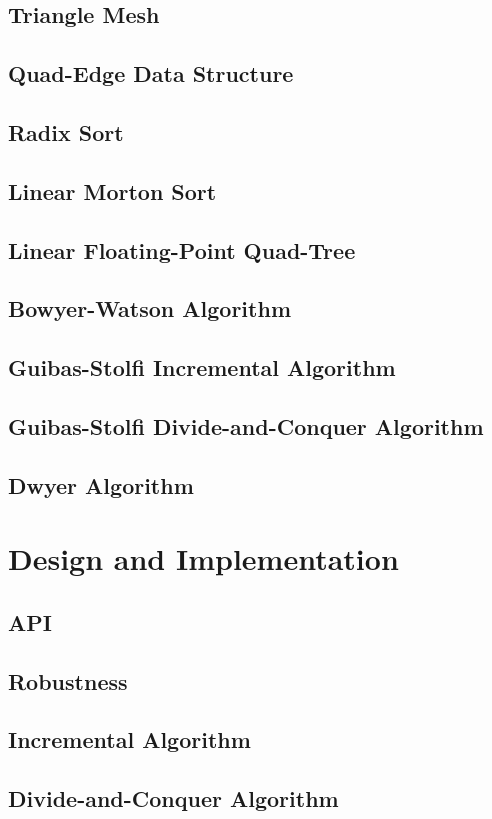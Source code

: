 \documentclass[10pt, twoside, fleqn]{article}
\let\oldsection\section
\renewcommand*\section{%
  \cleardoublepage
  \thispagestyle{sectionstyle}\oldsection}
\begin{document}
    \subsection{Triangle Mesh}
    \subsection{Quad-Edge Data Structure}
    \subsection{Radix Sort}
    \subsection{Linear Morton Sort}
    \subsection{Linear Floating-Point Quad-Tree}
    \subsection{Bowyer-Watson Algorithm}
    \subsection{Guibas-Stolfi Incremental Algorithm}
    \subsection{Guibas-Stolfi Divide-and-Conquer Algorithm}
    \subsection{Dwyer Algorithm}
  \section{Design and Implementation}
    \subsection{API}
    \subsection{Robustness}
    \subsection{Incremental Algorithm}
    \subsection{Divide-and-Conquer Algorithm}
\end{document}
